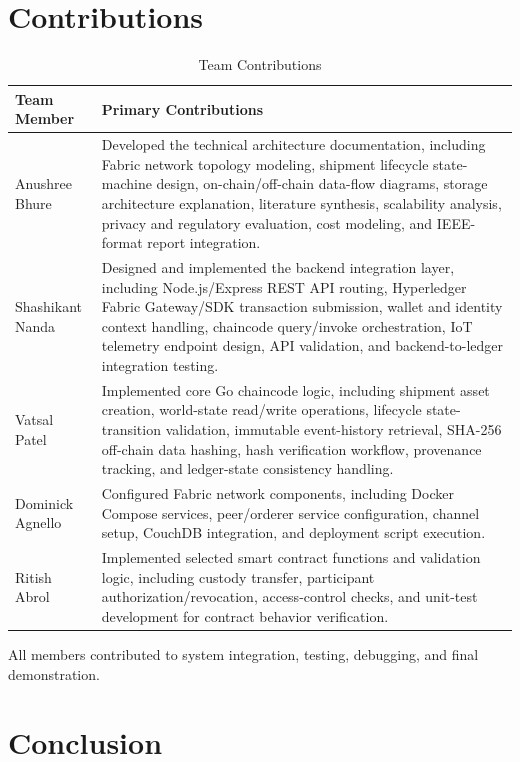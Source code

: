 \documentclass[conference]{IEEEtran}
\begin{document}
\section{Contributions}
\begin{table}[h]
\caption{Team Contributions}
\label{tab:contributions}
\centering
\footnotesize
\renewcommand{\arraystretch}{1.15}
\begin{tabularx}{\columnwidth}{@{}l X@{}}
\toprule
\textbf{Team Member} & \textbf{Primary Contributions} \\
\midrule
Anushree Bhure & Developed the technical architecture documentation, including Fabric network topology modeling, shipment lifecycle state-machine design, on-chain/off-chain data-flow diagrams, storage architecture explanation, literature synthesis, scalability analysis, privacy and regulatory evaluation, cost modeling, and IEEE-format report integration. \\
Shashikant Nanda & Designed and implemented the backend integration layer, including Node.js/Express REST API routing, Hyperledger Fabric Gateway/SDK transaction submission, wallet and identity context handling, chaincode query/invoke orchestration, IoT telemetry endpoint design, API validation, and backend-to-ledger integration testing. \\
Vatsal Patel & Implemented core Go chaincode logic, including shipment asset creation, world-state read/write operations, lifecycle state-transition validation, immutable event-history retrieval, SHA-256 off-chain data hashing, hash verification workflow, provenance tracking, and ledger-state consistency handling. \\
Dominick Agnello & Configured Fabric network components, including Docker Compose services, peer/orderer service configuration, channel setup, CouchDB integration, and deployment script execution. \\
Ritish Abrol & Implemented selected smart contract functions and validation logic, including custody transfer, participant authorization/revocation, access-control checks, and unit-test development for contract behavior verification. \\
\bottomrule
\end{tabularx}
\end{table}

All members contributed to system integration, testing, debugging, and final demonstration.

\section{Conclusion}
\end{document}
